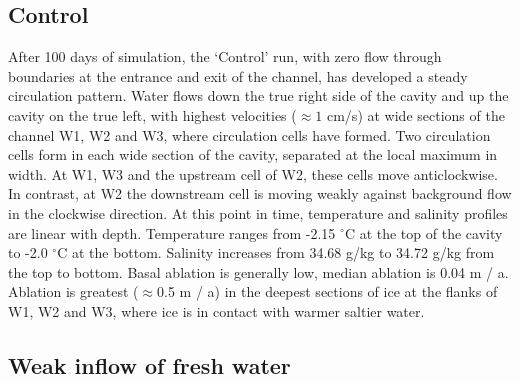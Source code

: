 


\subsection{Control} \label{sec:control_run}

After 100 days of simulation, the `Control' run, with zero flow through boundaries at the entrance and exit of the channel, has developed a steady circulation pattern.
Water flows down the true right side of the cavity and up the cavity on the true left, with highest velocities ($\approx 1$ cm/s) at wide sections of the channel W1, W2 and W3, where circulation cells have formed. Two circulation cells form in each wide section of the cavity, separated at the local maximum in width. At W1, W3 and the upstream cell of W2, these cells move anticlockwise. In contrast, at W2 the downstream cell is moving weakly against background flow in the clockwise direction.   At this point in time, temperature and salinity profiles are linear with depth. Temperature ranges from -2.15 $^{\circ}$C at the top of the cavity to -2.0 $^{\circ}$C at the bottom. Salinity increases from 34.68 g/kg to 34.72 g/kg from the top to bottom. 
Basal ablation is generally low, median ablation is 0.04 m / a. Ablation is greatest ($\approx$0.5 m / a) in the deepest sections of ice at the flanks of W1, W2 and W3, where ice is in contact with warmer saltier water.

\subsection{Weak inflow of fresh water} \label{sec:weak_BC_results}

